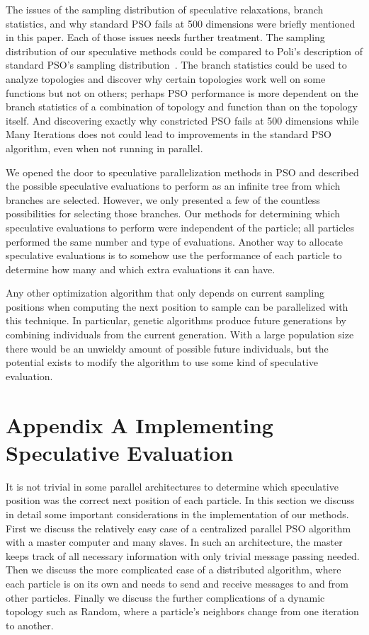 \documentclass[smallcondensed]{svjour3}
\begin{document}
The issues of the sampling distribution of speculative relaxations, branch
statistics, and why standard PSO fails at 500 dimensions were briefly mentioned
in this paper.  Each of those issues needs further treatment.  The sampling
distribution of our speculative methods could be compared to Poli's description
of standard PSO's sampling
distribution~\citep{poli-2008-sampling-distribution-of-pso}.  The branch
statistics could be used to analyze topologies and discover why certain
topologies work well on some functions but not on others; perhaps PSO
performance is more dependent on the branch statistics of a combination of
topology and function than on the topology itself.  And discovering exactly why
constricted PSO fails at 500 dimensions while Many Iterations does not could
lead to improvements in the standard PSO algorithm, even when not running in
parallel.

We opened the door to speculative parallelization methods in PSO and described
the possible speculative evaluations to perform as an infinite tree from which
branches are selected.  However, we only presented a few of the countless
possibilities for selecting those branches.  Our methods for determining which
speculative evaluations to perform were independent of the particle; all
particles performed the same number and type of evaluations.  Another way to
allocate speculative evaluations is to somehow use the performance of each
particle to determine how many and which extra evaluations it can have.

Any other optimization algorithm that only depends on current sampling
positions when computing the next position to sample can be parallelized with
this technique.  In particular, genetic algorithms produce future generations
by combining individuals from the current generation.  With a large population
size there would be an unwieldy amount of possible future individuals, but the
potential exists to modify the algorithm to use some kind of speculative
evaluation.

\appendix

\section*{Appendix A Implementing Speculative Evaluation}
\label{sec:implementation}

It is not trivial in some parallel architectures to determine which speculative
position was the correct next position of each particle.  In this section we
discuss in detail some important considerations in the implementation of our
methods.  First we discuss the relatively easy case of a centralized parallel
PSO algorithm with a master computer and many slaves.  In such an architecture,
the master keeps track of all necessary information with only trivial message
passing needed.  Then we discuss the more complicated case of a distributed
algorithm, where each particle is on its own and needs to send and receive
messages to and from other particles.  Finally we discuss the further
complications of a dynamic topology such as Random, where a particle's
neighbors change from one iteration to another.
\end{document}
